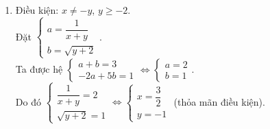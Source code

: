 \begin{bt}
{\begin{enumerate}
			Điều kiện: $x \ge 0$, $y \ge 1$.\\
			Đặt $\begin{cases} a = \dfrac{1}{\sqrt{x}}\\ b = \dfrac{1}{\sqrt{y-1}}\end{cases}$.\\ 
			Ta được hệ $\begin{cases} 3a + b = 2\\ a  + b = 1\end{cases} \Leftrightarrow \begin{cases} a = \dfrac{1}{2}\\ b = \dfrac{1}{2} \end{cases}$. \\
			Do đó $\begin{cases} \dfrac{1}{\sqrt{x}} = \dfrac{1}{2}\\ \dfrac{1}{\sqrt{y-1}} = \dfrac{1}{2} \end{cases} \Leftrightarrow \begin{cases} \sqrt{x} = 2\\ \sqrt{y-1} = 2 \end{cases} \Leftrightarrow \begin{cases} x = 4\\ y = 5 \end{cases}$ (thỏa mãn điều kiện).\\
			Vậy hệ có nghiệm duy nhất $\left(x;y\right) = \left(4;5\right)$.
			\item 
			Điều kiện: $x \ne -y$, $y \ge -2$.\\
			Đặt $\begin{cases} a = \dfrac{1}{x+y}\\ b = \sqrt{y+2}\end{cases}$.\\ 
			Ta được hệ $\begin{cases} a + b = 3\\ -2a  + 5b = 1\end{cases} \Leftrightarrow \begin{cases} a = 2\\ b = 1 \end{cases}$. \\
			Do đó $\begin{cases} \dfrac{1}{x+y} =2\\ \sqrt{y+2} = 1 \end{cases} \Leftrightarrow \begin{cases} x=\dfrac{3}{2}\\ y = -1 \end{cases}$ (thỏa mãn điều kiện).\\

\end{enumerate}}
\end{bt}

